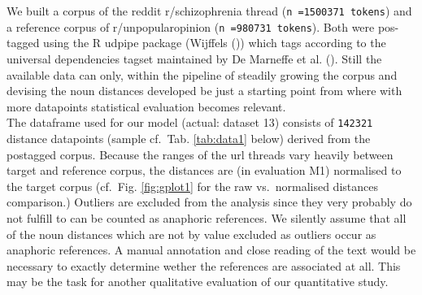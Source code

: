 \documentclass[
  12pt,
  oneside]{book}
\begin{document}
We built a corpus of the reddit r/schizophrenia thread (\texttt{n\ =1500371\ tokens}) and a reference corpus of r/unpopularopinion (\texttt{n\ =980731\ tokens}). Both were pos-tagged using the R udpipe package (Wijffels ()) which tags according to the universal dependencies tagset maintained by De Marneffe et al. (). Still the available data can only, within the pipeline of steadily growing the corpus and devising the noun distances developed be just a starting point from where with more datapoints statistical evaluation becomes relevant.\\
The dataframe used for our model (actual: dataset 13) consists of \texttt{142321} distance datapoints (sample cf.~Tab. \ref{tab:data1} below) derived from the postagged corpus. Because the ranges of the url threads vary heavily between target and reference corpus, the distances are (in evaluation M1) normalised to the target corpus (cf.~Fig. \ref{fig:gplot1} for the raw vs.~normalised distances comparison.) Outliers are excluded from the analysis since they very probably do not fulfill to can be counted as anaphoric references. We silently assume that all of the noun distances which are not by value excluded as outliers occur as anaphoric references. A manual annotation and close reading of the text would be necessary to exactly determine wether the references are associated at all. This may be the task for another qualitative evaluation of our quantitative study.
\end{document}
